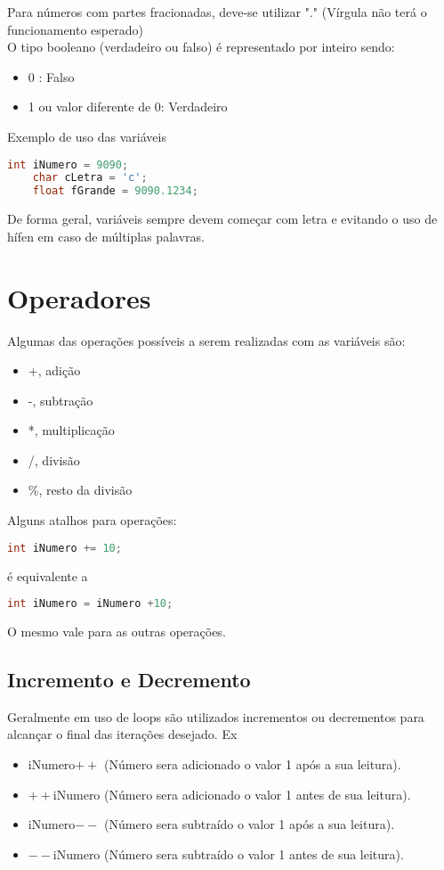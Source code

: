 \documentclass[12pt]{article}
\begin{document}
Para números com partes fracionadas, deve-se utilizar "." (Vírgula não terá o funcionamento esperado)
\\O tipo booleano (verdadeiro ou falso) é representado por inteiro sendo:
\begin{itemize}
	\item 0 : Falso
	\item 1 ou valor diferente de 0: Verdadeiro
\end{itemize}
Exemplo de uso das variáveis
\begin{lstlisting}[language=C]
	int iNumero = 9090;
	char cLetra = 'c';
	float fGrande = 9090.1234;
\end{lstlisting}
De forma geral, variáveis sempre devem começar com letra e evitando o uso de hífen em caso de múltiplas palavras.

\section{Operadores}
Algumas das operações possíveis a serem realizadas com as variáveis são:
\begin{itemize}
	\item +, adição
	\item -, subtração
	\item *, multiplicação
	\item /, divisão
	\item \%, resto da divisão
\end{itemize}
Alguns atalhos para operações:
\begin{lstlisting}[language=C]
	int iNumero += 10;
\end{lstlisting}
é equivalente a 
\begin{lstlisting}[language=C]
	int iNumero = iNumero +10;
\end{lstlisting}
O mesmo vale para as outras operações.
\subsection{Incremento e Decremento}
Geralmente em uso de loops são utilizados incrementos ou decrementos para alcançar o final das iterações desejado. Ex
\begin{itemize}
	\item iNumero$++ $ (Número sera adicionado o valor 1 após a sua leitura).
	\item $++$iNumero (Número sera adicionado o valor 1 antes de sua leitura).
	
	\item iNumero$-- $ (Número sera subtraído o valor 1 após a sua leitura).
	\item $--$iNumero (Número sera subtraído o valor 1 antes de sua leitura).
\end{itemize}
\end{document}
